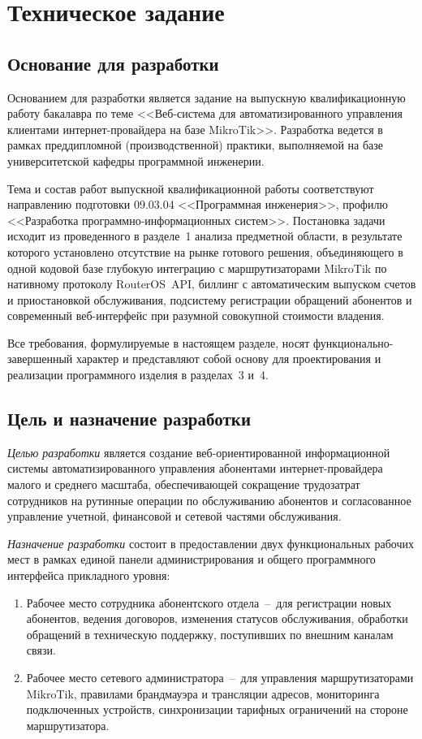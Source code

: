 \section{Техническое задание}

\subsection{Основание для разработки}

Основанием для разработки является задание на выпускную квалификационную работу бакалавра по теме <<Веб-система для автоматизированного управления клиентами интернет-провайдера на базе MikroTik>>. Разработка ведется в рамках преддипломной (производственной) практики, выполняемой на базе университетской кафедры программной инженерии.

Тема и состав работ выпускной квалификационной работы соответствуют направлению подготовки 09.03.04 <<Программная инженерия>>, профилю <<Разработка программно-информационных систем>>. Постановка задачи исходит из проведенного в разделе~1 анализа предметной области, в результате которого установлено отсутствие на рынке готового решения, объединяющего в одной кодовой базе глубокую интеграцию с маршрутизаторами MikroTik по нативному протоколу RouterOS~API, биллинг с автоматическим выпуском счетов и приостановкой обслуживания, подсистему регистрации обращений абонентов и современный веб-интерфейс при разумной совокупной стоимости владения.

Все требования, формулируемые в настоящем разделе, носят функционально-завершенный характер и представляют собой основу для проектирования и реализации программного изделия в разделах~3 и~4.

\subsection{Цель и назначение разработки}

\emph{Целью разработки} является создание веб-ориентированной информационной системы автоматизированного управления абонентами интернет-провайдера малого и среднего масштаба, обеспечивающей сокращение трудозатрат сотрудников на рутинные операции по обслуживанию абонентов и согласованное управление учетной, финансовой и сетевой частями обслуживания.

\emph{Назначение разработки} состоит в предоставлении двух функциональных рабочих мест в рамках единой панели администрирования и общего программного интерфейса прикладного уровня:
\begin{enumerate}
\item Рабочее место сотрудника абонентского отдела~--~для регистрации новых абонентов, ведения договоров, изменения статусов обслуживания, обработки обращений в техническую поддержку, поступивших по внешним каналам связи.
\item Рабочее место сетевого администратора~--~для управления маршрутизаторами MikroTik, правилами брандмауэра и трансляции адресов, мониторинга подключенных устройств, синхронизации тарифных ограничений на стороне маршрутизатора.
\end{enumerate}

